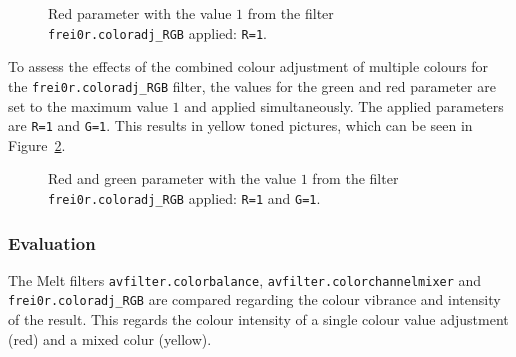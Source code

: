 \documentclass[../MasterThesis.tex]{subfiles}
\begin{document}
\begin{figure}[H]
	\begin{center}
		\label{figure:r}
		\caption[Red parameter set to $1$ with \texttt{frei0r.coloradj\_RGB}.]{Red parameter with the value $1$ from the filter \texttt{frei0r.coloradj\_RGB} applied: \texttt{R=1}.}
	\end{center}
\end{figure}

To assess the effects of the combined colour adjustment of multiple colours for the \texttt{frei0r.coloradj\_RGB} filter, the values for the green and red parameter are set to the maximum value $1$ and applied simultaneously. The applied parameters are \texttt{R=1} and \texttt{G=1}. This results in yellow toned pictures, which can be seen in Figure~\ref{figure:rg}.


\begin{figure}[H]
	\begin{center}
		\label{figure:rg}
		\caption[Red and green parameter set to $1$ with \texttt{frei0r.coloradj\_RGB}.]{Red and green parameter with the value $1$ from the filter \texttt{frei0r.coloradj\_RGB} applied: \texttt{R=1} and \texttt{G=1}.}
	\end{center}
\end{figure}




\subsubsection*{Evaluation}




The Melt filters \texttt{avfilter.colorbalance}, \texttt{avfilter\-.colorchannelmixer} and \texttt{frei\-0r\-.coloradj\_RGB} are compared regarding the colour vibrance and intensity of the result. This regards the colour intensity of a single colour value adjustment (red) and a mixed colur (yellow).

\end{document}
